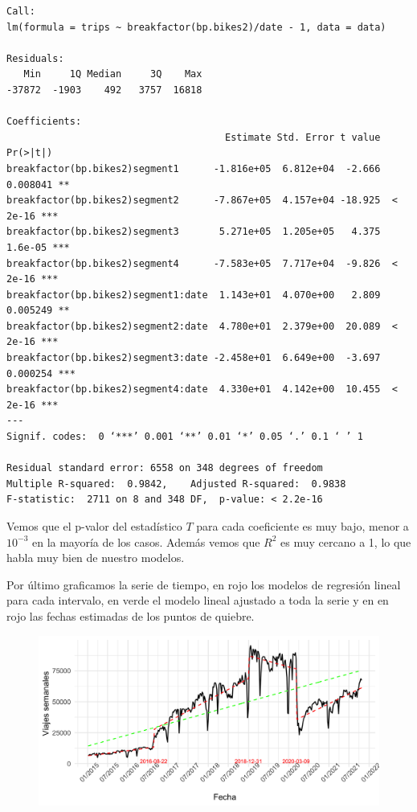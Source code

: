 \documentclass[
]{article}
\begin{document}
\begin{verbatim}
Call:
lm(formula = trips ~ breakfactor(bp.bikes2)/date - 1, data = data)

Residuals:
   Min     1Q Median     3Q    Max
-37872  -1903    492   3757  16818

Coefficients:
                                      Estimate Std. Error t value Pr(>|t|)
breakfactor(bp.bikes2)segment1      -1.816e+05  6.812e+04  -2.666 0.008041 **
breakfactor(bp.bikes2)segment2      -7.867e+05  4.157e+04 -18.925  < 2e-16 ***
breakfactor(bp.bikes2)segment3       5.271e+05  1.205e+05   4.375  1.6e-05 ***
breakfactor(bp.bikes2)segment4      -7.583e+05  7.717e+04  -9.826  < 2e-16 ***
breakfactor(bp.bikes2)segment1:date  1.143e+01  4.070e+00   2.809 0.005249 **
breakfactor(bp.bikes2)segment2:date  4.780e+01  2.379e+00  20.089  < 2e-16 ***
breakfactor(bp.bikes2)segment3:date -2.458e+01  6.649e+00  -3.697 0.000254 ***
breakfactor(bp.bikes2)segment4:date  4.330e+01  4.142e+00  10.455  < 2e-16 ***
---
Signif. codes:  0 ‘***’ 0.001 ‘**’ 0.01 ‘*’ 0.05 ‘.’ 0.1 ‘ ’ 1

Residual standard error: 6558 on 348 degrees of freedom
Multiple R-squared:  0.9842,	Adjusted R-squared:  0.9838
F-statistic:  2711 on 8 and 348 DF,  p-value: < 2.2e-16
\end{verbatim}

Vemos que el p-valor del estadístico \(T\) para cada coeficiente es muy
bajo, menor a \(10^{-3}\) en la mayoría de los casos. Además vemos que
\(R^2\) es muy cercano a 1, lo que habla muy bien de nuestro modelos.

Por último graficamos la serie de tiempo, en rojo los modelos de
regresión lineal para cada intervalo, en verde el modelo lineal ajustado
a toda la serie y en en rojo las fechas estimadas de los puntos de
quiebre.

\begin{figure}
\centering
\includegraphics{../plots/serie_breaks.png}
\caption{}
\end{figure}
\end{document}
